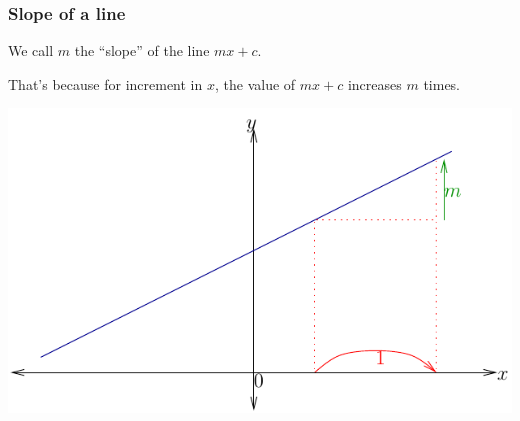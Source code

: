\documentclass[xcolor=pdftex,dvipsnames]{beamer}
\begin{document}
\begin{frame}
\begin{center}
{}
\end{center}


\end{frame}



\begin{frame}\frametitle{Slope of a line}
We call $m$ the ``slope'' of the line $mx+c$.

That's because for increment in $x$, the value of $mx+c$ increases $m$
times.

\begin{center}
\includegraphics[scale=0.7]{pics/slope}
\end{center}
\end{frame}
\end{document}
